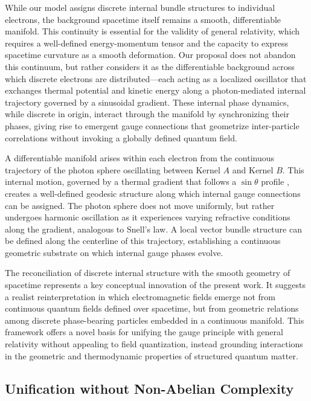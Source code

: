 \documentclass[%
 reprint,
 amsmath,amssymb,
 aps,
]{revtex4-1}
\numberwithin{equation}{section}%
\begin{document}
While our model assigns discrete internal bundle structures to individual electrons, the background spacetime itself remains a smooth, differentiable manifold. This continuity is essential for the validity of general relativity, which requires a well-defined energy-momentum tensor and the capacity to express spacetime curvature as a smooth deformation. Our proposal does not abandon this continuum, but rather considers it as the differentiable background across which discrete electrons are distributed---each acting as a localized oscillator that exchanges thermal potential and kinetic energy along a photon-mediated internal trajectory governed by a sinusoidal gradient. These internal phase dynamics, while discrete in origin, interact through the manifold by synchronizing their phases, giving rise to emergent gauge connections that geometrize inter-particle correlations without invoking a globally defined quantum field.

A differentiable manifold arises within each electron from the continuous trajectory of the photon sphere oscillating between Kernel $A$ and Kernel $B$. This internal motion, governed by a thermal gradient that follows a $\sin\theta$ profile \cite{hanamura2018}, creates a well-defined geodesic structure along which internal gauge connections can be assigned. The photon sphere does not move uniformly, but rather undergoes harmonic oscillation as it experiences varying refractive conditions along the gradient, analogous to Snell's law. A local vector bundle structure can be defined along the centerline of this trajectory, establishing a continuous geometric substrate on which internal gauge phases evolve.

The reconciliation of discrete internal structure with the smooth geometry of spacetime represents a key conceptual innovation of the present work. It suggests a realist reinterpretation in which electromagnetic fields emerge not from continuous quantum fields defined over spacetime, but from geometric relations among discrete phase-bearing particles embedded in a continuous manifold. This framework offers a novel basis for unifying the gauge principle with general relativity without appealing to field quantization, instead grounding interactions in the geometric and thermodynamic properties of structured quantum matter.


\subsection{Unification without Non-Abelian Complexity}
\end{document}
